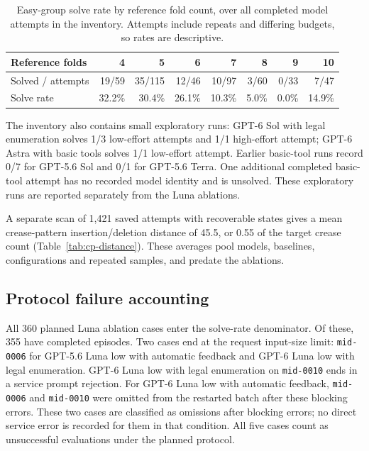 \begin{table}[htbp]
\centering
\caption{Easy-group solve rate by reference fold count, over all completed model attempts in the
inventory. Attempts include repeats and differing budgets, so rates are descriptive.}
\label{tab:easy-depth}
\small
\begin{tabular}{lrrrrrrr}
\hline
Reference folds & 4 & 5 & 6 & 7 & 8 & 9 & 10 \\
\hline
Solved / attempts & 19/59 & 35/115 & 12/46 & 10/97 & 3/60 & 0/33 & 7/47 \\
Solve rate & 32.2\% & 30.4\% & 26.1\% & 10.3\% & 5.0\% & 0.0\% & 14.9\% \\
\hline
\end{tabular}
\end{table}

The inventory also contains small exploratory runs: GPT-6 Sol with legal enumeration
solves 1/3 low-effort attempts and 1/1 high-effort attempt; GPT-6 Astra with basic tools
solves 1/1 low-effort attempt. Earlier basic-tool runs record 0/7 for GPT-5.6 Sol and
0/1 for GPT-5.6 Terra. One additional completed basic-tool attempt has no recorded
model identity and is unsolved. These exploratory runs are reported separately from the Luna ablations.

\label{sec:results-distance}
A separate scan of 1,421 saved attempts with recoverable states gives a mean crease-pattern
insertion/deletion distance of 45.5, or 0.55 of the target crease count
(Table~\ref{tab:cp-distance}). These averages pool models, baselines, configurations and repeated
samples, and predate the ablations.



\subsection{Protocol failure accounting}
\label{app:protocol-failures}
All 360 planned Luna ablation cases enter the solve-rate denominator. Of these,
355 have completed episodes. Two cases end at the request input-size limit:
\texttt{mid-0006} for GPT-5.6 Luna low with automatic feedback and GPT-6 Luna low
with legal enumeration. GPT-6 Luna low with legal enumeration on \texttt{mid-0010}
ends in a service prompt rejection. For GPT-6 Luna low with automatic feedback,
\texttt{mid-0006} and \texttt{mid-0010} were omitted from the restarted batch after
these blocking errors. These two cases are classified as omissions after blocking errors;
no direct service error is recorded for them in that condition. All five cases
count as unsuccessful evaluations under the planned protocol.

